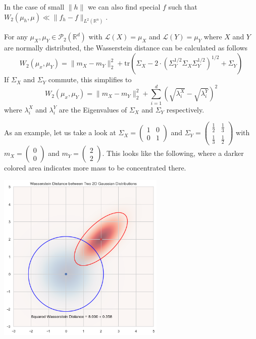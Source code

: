 \documentclass[15pt]{article}
\begin{document}
In the case of small $\|h\|$ we can also find special $f$ such that $W_2(\mu_h,\mu) \ll \|f_h-f\|_{L^2(\mathbb{R}^n)}$. 

\bigbreak
For any $\mu_X,\mu_Y \in \mathcal{P}_2(\mathbb{R}^d)$ with $\mathcal{L}(X) = \mu_X$ and $\mathcal{L}(Y) = \mu_Y$ where $X$ and $Y$ are normally distributed, 
the Wasserstein distance can be calculated as follows $$W_2(\mu_x,\mu_Y) = \|m_X-m_Y\|_2^2 + \text{tr}\left(\Sigma_X-2 \cdot \left(\Sigma_Y^{1/2}\Sigma_X\Sigma_Y^{1/2}\right)^{1/2}+\Sigma_Y\right)$$
If $\Sigma_X$ and $\Sigma_Y$ commute, this simplifies to $$W_2(\mu_x,\mu_Y) = \|m_X-m_Y\|_2^2 + \sum_{i = 1}^d \left( \sqrt{\lambda_i^X} - \sqrt{\lambda_i^Y}  \right)^2$$
where $\lambda_i^X$ and $\lambda_i^Y$ are the Eigenvalues of $\Sigma_X$ and $\Sigma_Y$ respectively. 

As an example, let us take a look at $\Sigma_X = \begin{pmatrix}1 & 0 \\ 0 & 1\end{pmatrix}$ and $\Sigma_Y = \begin{pmatrix}\frac{1}{2} & \frac{1}{3} \\ \frac{1}{3} & \frac{1}{2} \end{pmatrix}$ 
with $m_X = \begin{pmatrix}0 \\ 0 \end{pmatrix}$ and $m_Y = \begin{pmatrix}2 \\ 2 \end{pmatrix}$. 
This looks like the following, where a darker colored area indicates more mass to be concentrated there. 


\begin{center}
  \includegraphics*[width=0.6\textwidth]{Wasserstein.png}  
\end{center}
\end{document}
